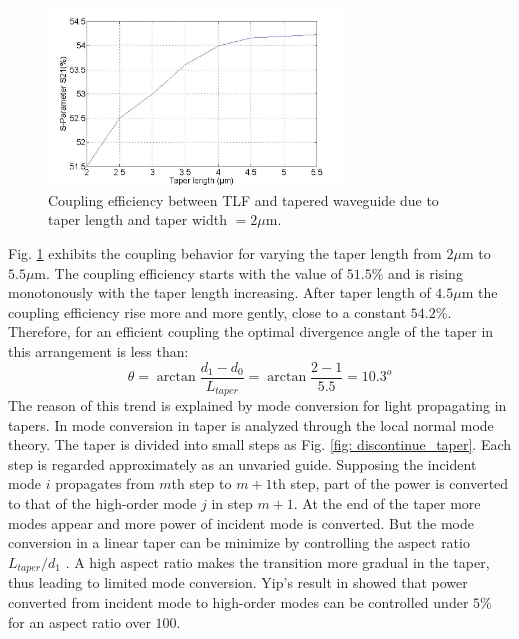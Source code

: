 \begin{figure}[!ht]
\centering
\includegraphics[width=0.7\textwidth]{bilder/tapered_waveguide_dxx}
\caption{Coupling efficiency between TLF and tapered waveguide due to taper length and taper width $= 2\mu$m.}
\label{fig:tapered_waveguide_dxx}
\end{figure}
Fig. \ref{fig:tapered_waveguide_dxx} exhibits the coupling behavior for varying the taper length from $2\mu$m to $5.5\mu$m. The coupling efficiency starts with the value of $51.5\%$ and is rising monotonously with the taper length increasing. After taper length of $4.5\mu$m the coupling efficiency rise more and more gently, close to a constant $54.2\%$. 
Therefore, for an efficient coupling the optimal divergence angle of the taper in this arrangement is less than:
\begin{equation}
\theta=\arctan\frac{d_{1}-d_{0}}{L_{taper}}=\arctan\frac{2-1}{5.5}=10.3^{o}
\label{eq:divergence_angle}
\end{equation}
The reason of this trend is explained by mode conversion for light propagating in tapers. In \cite{integrated_optics,mode_conversion_optical_waveguide} mode conversion in taper is analyzed through the local normal mode theory. The taper is divided into small steps as Fig. \ref{fig: discontinue_taper}. Each step is regarded approximately as an unvaried guide. Supposing the incident mode $i$ propagates from $m$th step to $m+1$th step, part of the power is converted to that of the high-order mode $j$ in step $m+1$. At the end of the taper more modes appear and more power of incident mode is converted. But the mode conversion in a linear taper can be minimize by controlling the aspect ratio $L_{taper}/d_{1}$ . A high aspect ratio makes the transition more gradual in the taper, thus leading to limited mode conversion. Yip's result in \cite{mode_conversion_optical_waveguide} showed that power converted from incident mode to high-order modes can be controlled under $5\%$ for an aspect ratio over $100$.\\

